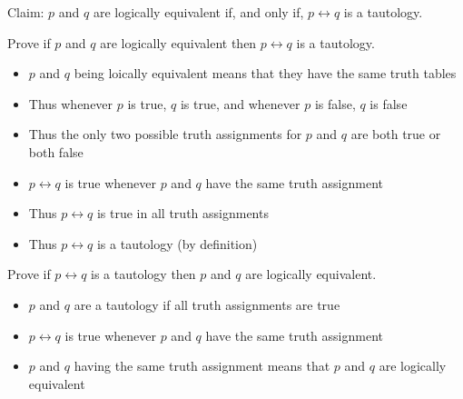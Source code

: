 \documentclass[12pt]{article}
\begin{document}
Claim: $p$ and $q$ are logically equivalent if, and only if, $p \leftrightarrow q$ is a tautology. 



Prove if $p$ and $q$ are logically equivalent then $p \leftrightarrow q$ is a tautology.
\begin{itemize}
    \item $p$ and $q$ being loically equivalent means that they have the same truth tables
    \item Thus whenever $p$ is true, $q$ is true, and whenever $p$ is false, $q$ is false
    \item Thus the only two possible truth assignments for $p$ and $q$ are both true or both false
    \item $p \leftrightarrow q$ is true whenever $p$ and $q$ have the same truth assignment
    \item Thus $p \leftrightarrow q$ is true in all truth assignments
    \item Thus $p \leftrightarrow q$ is a tautology (by definition)
\end{itemize}

Prove if $p \leftrightarrow q$ is a tautology then $p$ and $q$ are logically equivalent.

\begin{itemize}
    \item $p$ and $q$ are a tautology if all truth assignments are true
    \item $p \leftrightarrow q$ is true whenever $p$ and $q$ have the same truth assignment
    \item $p$ and $q$ having the same truth assignment means that $p$ and $q$ are logically equivalent
\end{itemize}
\end{document}
